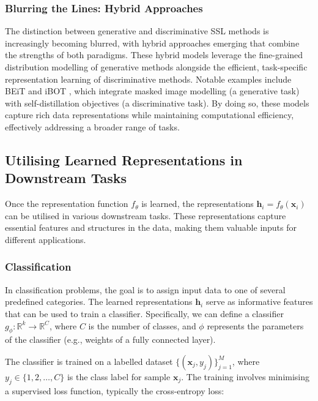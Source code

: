 \subsubsection{Blurring the Lines: Hybrid Approaches}

The distinction between generative and discriminative SSL methods is increasingly becoming blurred, with hybrid approaches emerging that combine the strengths of both paradigms. These hybrid models leverage the fine-grained distribution modelling of generative methods alongside the efficient, task-specific representation learning of discriminative methods. Notable examples include BEiT \citep{bao2021beit} and iBOT \citep{zhou2022ibot}, which integrate masked image modelling (a generative task) with self-distillation objectives (a discriminative task). By doing so, these models capture rich data representations while maintaining computational efficiency, effectively addressing a broader range of tasks.

  


  


\subsection{Utilising Learned Representations in Downstream Tasks}

Once the representation function \( f_{\theta} \) is learned, the representations \( \mathbf{h}_i = f_{\theta}(\mathbf{x}_i) \) can be utilised in various downstream tasks. These representations capture essential features and structures in the data, making them valuable inputs for different applications.

\subsubsection{Classification}

In classification problems, the goal is to assign input data to one of several predefined categories. The learned representations \( \mathbf{h}_i \) serve as informative features that can be used to train a classifier. Specifically, we can define a classifier \( g_{\phi} : \mathbb{R}^k \rightarrow \mathbb{R}^C \), where \( C \) is the number of classes, and \( \phi \) represents the parameters of the classifier (e.g., weights of a fully connected layer).

The classifier is trained on a labelled dataset \( \{ (\mathbf{x}_j, y_j) \}_{j=1}^M \), where \( y_j \in \{1, 2, \dots, C\} \) is the class label for sample \( \mathbf{x}_j \). The training involves minimising a supervised loss function, typically the cross-entropy loss:

